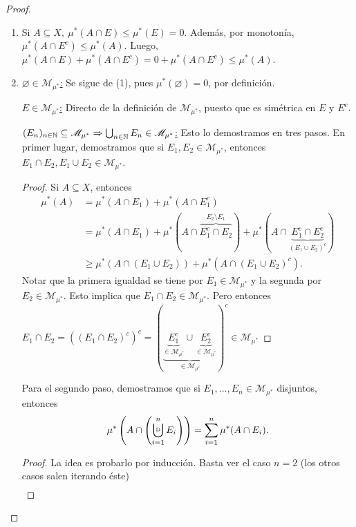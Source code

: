 \begin{proof}~
	\begin{enumerate}
		\item Si $A \subseteq X,\ \mu^{*}(A \cap E) \leq \mu^{*}(E) = 0$. Además, por monotonía, $\mu^{*}(A \cap E^c) \leq \mu^{*}(A)$. Luego, $\mu^{*}(A \cap E) + \mu^{*}(A \cap E^c) = 0 + \mu^{*}(A \cap E^c) \leq \mu^{*}(A)$.

		\item \underline{$\varnothing \in \mathscr{M}_{\mu^{*}}$:} Se sigue de (1), pues $\mu^{*}(\varnothing) = 0$, por definición.

		\underline{$E \in \mathscr{M}_{\mu^{*}}$:} Directo de la definición de $\mathscr{M}_{\mu^{*}}$, puesto que es simétrica en $E$ y $E^c$.

		\underline{$(E_n)_{n\in\mathbb{N}} \subseteq \mathscr{M}_{\mu^{*}} \Rightarrow \bigcup_{n\in\mathbb{N}} E_n \in \mathscr{M}_{\mu^{*}}$:} Esto lo demostramos en tres pasos. En primer lugar, demostramos que si $E_1,E_2 \in \mathscr{M}_{\mu^{*}}$, entonces $E_1 \cap E_2, E_1 \cup E_2 \in \mathscr{M}_{\mu^{*}}$.
		\begin{proof}
			Si $A \subseteq X$, entonces
			\begin{align*}
				\mu^{*}(A) & = \mu^{*}(A \cap E_1) + \mu^{*}(A \cap E_1^c) \\
				& = \mu^{*}(A \cap E_1) + \mu^{*}(A \cap \overbrace{E_1^c \cap E_2}^{E_2 \setminus E_1}) + \mu^{*}(A \cap \underbrace{E_1^c \cap E_2^c}_{(E_1 \cup E_2)^c}) \\
				& \geq \mu^{*}(A \cap (E_1 \cup E_2)) + \mu^{*}(A \cap (E_1 \cup E_2)^c) 
			.\end{align*}
			Notar que la primera igualdad se tiene por $E_1 \in \mathscr{M}_{\mu^{*}}$ y la segunda por $E_2 \in \mathscr{M}_{\mu^{*}}$. Esto implica que $E_1 \cap E_2 \in \mathscr{M}_{\mu^{*}}$. Pero entonces $E_1 \cap E_2 = ((E_1 \cap E_2)^c)^c = (\underbrace{\underbrace{E_{1}^c}_{\in \mathscr{M}_{\mu^{*}}} \cup \underbrace{E_{2}^c}_{\in \mathscr{M}_{\mu^{*}}}}_{\in \mathscr{M}_{\mu^{*}}})^c \in \mathscr{M}_{\mu^{*}}$
		\end{proof}
		Para el segundo paso, demostramos que si $E_1,\dots,E_n \in \mathscr{M}_{\mu^{*}}$ disjuntos, entonces 
		\[ \mu^{*}\left(A \cap \left(\displaystyle\bigcupd_{i=1}^{n} E_i \right)\right) = \displaystyle\sum_{i=1}^{n} \mu^{*}(A \cap E_i). \]
		\begin{proof}
			La idea es probarlo por inducción. Basta ver el caso $n=2$ (los otros casos salen iterando éste)
			\begin{align*}

\end{align*}
\end{proof}
\end{enumerate}
\end{proof}
